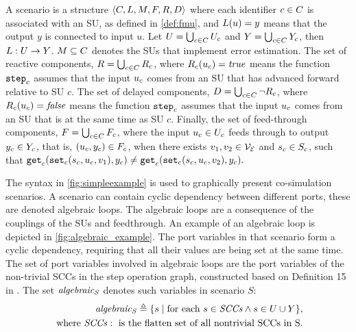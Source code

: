 \begin{definition}[Scenario]\label{def:cosim_scenario}
  A scenario is a structure $ \left\langle C, L, M, F, R, D \right\rangle $ where each identifier $c \in C$ is associated with an SU, as defined in \cref{def:fmu}, and $L(u)=y$ means that the output $y$ is connected to input $u$.
  Let $U = \bigcup_{c \in C} U_{c}$ and $Y = \bigcup_{c \in C} Y_{c}$, then $L : U \to Y$. 
  $M \subseteq C$ denotes the SUs that implement error estimation. 
  The set of reactive components,
  $R = \bigcup_{c \in C} R_{c}$, where $R_{c}(u_{c}) = \mathit{true}$ means the function $\mathtt{step}_{c}$ assumes that the input $u_{c}$ comes from an SU that has advanced forward relative to SU $c$.  
The set of delayed components,
  $D = \bigcup_{c \in C} \neg R_{c}$, where $R_{c}(u_{c}) = \mathit{false}$ means the function $\mathtt{step}_{c}$ assumes that the input $u_{c}$ comes from an SU that is at the same time as SU $c$. 
 Finally, the set of feed-through components, $F = \bigcup_{c \in C} F_{c}$, where the input $u_{c} \in U_{c}$ feeds through to output $y_{c} \in Y_{c}$, that is, $(u_{c},y_{c}) \in F_{c}$, when there exists $v_1, v_2 \in \mathcal{V_{E}}$ and $s_{c} \in S_{c}$, such that
  $\mathtt{get}_{c} (\mathtt{set}_{c}(s_{c}, u_{c}, v_1), y_{c}) \neq \mathtt{get}_{c} (\mathtt{set}_{c}(s_{c}, u_{c}, v_2), y_{c}).$
\end{definition}  

The syntax in \cref{fig:simpleexample} is used to graphically present co-simulation scenarios.
A scenario can contain cyclic dependency between different ports, these are denoted algebraic loops.
The algebraic loops are a consequence of the couplings of the SUs and feedthrough. 
An example of an algebraic loop is depicted in \cref{fig:algebraic_example}.
The port variables in that scenario form a cyclic dependency, requiring that all their values are being set at the same time. 
The set of port variables involved in algebraic loops are the port variables of the non-trivial SCCs in the step operation graph, constructed based on Definition 15 in \cite{Gomes2019c}.
The set $\mathit{algebraic_{S}}$ denotes such variables in scenario $S$:
\begin{align*}
  \mathit{algebraic_{S}} \triangleq \{s \mid \text{for each\ } s \in \mathit{SCCs} \land s \in U \cup Y\}, \\
  \text{ where } \mathit{SCCs}: \text{ is the flatten set of all nontrivial SCCs in S}.
\end{align*}
\vspace{-0.5em}

